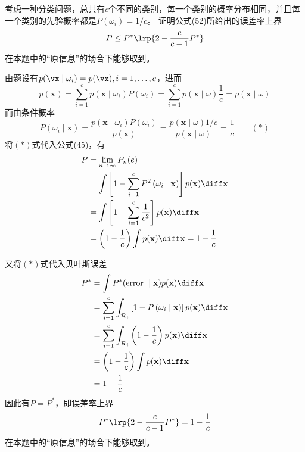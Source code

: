 \documentclass[reportComp]{thesis}
\begin{document}
\begin{question}[\textsection 4 Q17]
考虑一种分类问题，总共有$c$个不同的类别，每一个类别的概率分布相同，并且每一个类别的先验概率都是$P(\omega_i)=1/c$。
证明公式(52)所给出的误差率上界
\[P\leq P^*\lrp{2-\frac{c}{c-1}P^*}\]
在本题中的“原信息”的场合下能够取到。
\end{question}
\begin{answer}
由题设有$p(\vx\mid\omega_i)=p(\vx),i=1,\ldots,c$，进而
\[p(\mathbf{x})=\sum_{i=1}^{c} p\left(\mathbf{x} \mid \omega_{i}\right) P\left(\omega_{i}\right)=\sum_{i=1}^{c} p(\mathbf{x} \mid \omega) \frac{1}{c}=p(\mathbf{x} \mid \omega)\]
而由条件概率
\[P\left(\omega_{i} \mid \mathbf{x}\right)=\frac{p\left(\mathbf{x} \mid \omega_{i}\right) P\left(\omega_{i}\right)}{p(\mathbf{x})}=\frac{p(\mathbf{x} \mid \omega) 1 / c}{p(\mathbf{x} \mid \omega)}=\frac{1}{c}\qquad(*)\]
将$(*)$式代入公式(45)，有
\[\begin{aligned}
P &=\lim _{n \rightarrow \infty} P_{n}(e) \\
&=\int\left[1-\sum_{i=1}^{c} P^{2}\left(\omega_{i} \mid \mathbf{x}\right)\right] p(\mathbf{x}) \diff \mathbf{x} \\
&=\int\left[1-\sum_{i=1}^{c} \frac{1}{c^{2}}\right] p(\mathbf{x}) \diff \mathbf{x} \\
&=\left(1-\frac{1}{c}\right) \int p(\mathbf{x}) \diff \mathbf{x}=1-\frac{1}{c}
\end{aligned}\]

又将$(*)$式代入贝叶斯误差
\[\begin{aligned}
P^{*} &=\int P^{*}(\text {error } \mid \mathbf{x}) p(\mathbf{x}) \diff \mathbf{x} \\
&=\sum_{i=1}^{c} \int_{\mathcal{R}_{i}}\left[1-P\left(\omega_{i} \mid \mathbf{x}\right)\right] p(\mathbf{x}) \diff \mathbf{x}\\
&=\sum_{i=1}^{c} \int_{\mathcal{R}_{i}}\left(1-\frac{1}{c}\right) p(\mathbf{x}) \diff \mathbf{x}\\
&=\left(1-\frac{1}{c}\right) \int p(\mathbf{x}) \diff \mathbf{x}\\
&=1-\frac{1}{c}
\end{aligned}\]
因此有$P=P^*$，即误差率上界
\[P^*\lrp{2-\frac{c}{c-1}P^*}=1-\frac{1}{c}\]
在本题中的“原信息”的场合下能够取到。
\end{answer}
\end{document}
